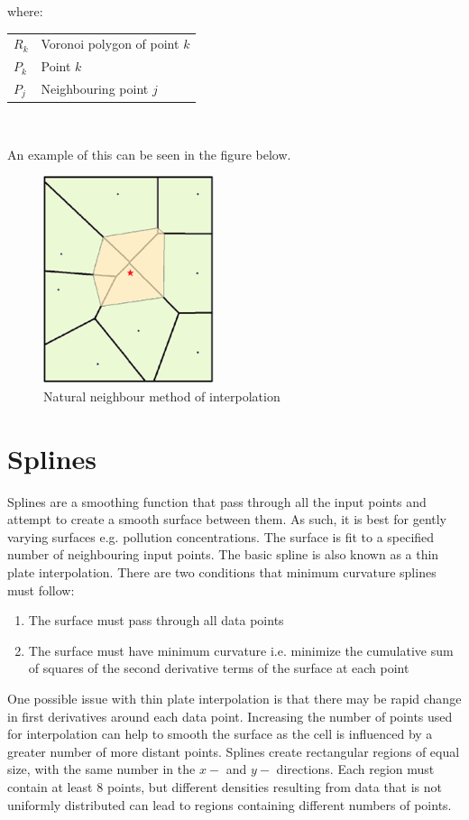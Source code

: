 \documentclass{article}
\makeatletter
\newenvironment{conditions}[1][where:] 
  {#1 \begin{tabular}[t]{>{$}l<{$} @{${}={}$} l}}
  {\end{tabular}\\[\belowdisplayskip]}
\makeatother
\begin{document}
\begin{conditions}
    R_{k} & Voronoi polygon of point $k$ \\
    P_{k} & Point $k$ \\ 
    P_{j} & Neighbouring point $j$
\end{conditions}

An example of this can be seen in the figure below.

\begin{figure}[h]
    \centering
    \label{Natural neighbour method of interpolation}
    \caption{Natural neighbour method of interpolation}
    \includegraphics[width=5cm]{natural-neighbour.png}
\end{figure}

\section{Splines}

Splines are a smoothing function that pass through all the input points and attempt to create a smooth surface between them.
As such, it is best for gently varying surfaces e.g. pollution concentrations.
The surface is fit to a specified number of neighbouring input points.
The basic spline is also known as a thin plate interpolation.
There are two conditions that minimum curvature splines must follow:

\begin{enumerate}
    \item The surface must pass through all data points
    \item The surface must have minimum curvature i.e. minimize the cumulative sum of squares of the second derivative terms of the surface at each point
\end{enumerate}

One possible issue with thin plate interpolation is that there may be rapid change in first derivatives around each data point.
Increasing the number of points used for interpolation can help to smooth the surface as the cell is influenced by a greater number of more distant points.
Splines create rectangular regions of equal size, with the same number in the $x-$ and $y-$ directions.
Each region must contain at least 8 points, but different densities resulting from data that is not uniformly distributed can lead to regions containing different numbers of points.
\end{document}
